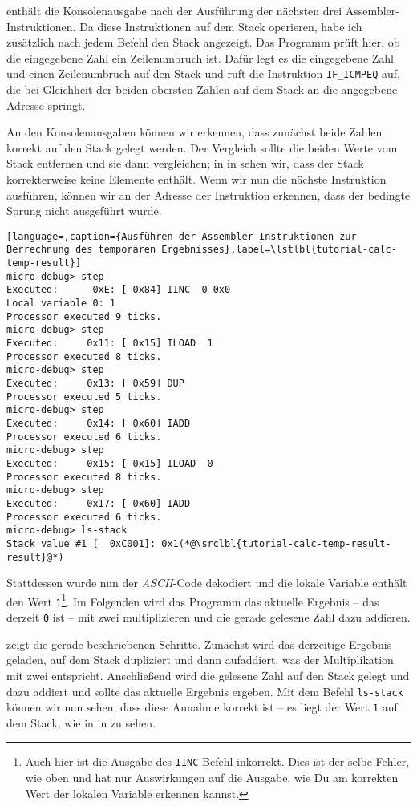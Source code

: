  enthält die Konsolenausgabe nach der Ausführung der nächsten drei Assembler-Instruktionen. Da diese Instruktionen auf dem Stack operieren, habe ich zusätzlich nach jedem Befehl den Stack angezeigt. Das Programm prüft hier, ob die eingegebene Zahl ein Zeilenumbruch ist. Dafür legt es die eingegebene Zahl und einen Zeilenumbruch auf den Stack und ruft die Instruktion \texttt{IF_ICMPEQ} auf, die bei Gleichheit der beiden obersten Zahlen auf dem Stack an die angegebene Adresse springt.

An den Konsolenausgaben können wir erkennen, dass zunächst beide Zahlen korrekt auf den Stack gelegt werden. Der Vergleich sollte die beiden Werte vom Stack entfernen und sie dann vergleichen; in  in  sehen wir, dass der Stack korrekterweise keine Elemente enthält. Wenn wir nun die nächste Instruktion ausführen, können wir an der Adresse der Instruktion erkennen, dass der bedingte Sprung nicht ausgeführt wurde.

\begin{lstlisting}[language=,caption={Ausführen der Assembler-Instruktionen zur Berrechnung des temporären Ergebnisses},label=\lstlbl{tutorial-calc-temp-result}]
micro-debug> step
Executed:      0xE: [ 0x84] IINC  0 0x0
Local variable 0: 1
Processor executed 9 ticks.
micro-debug> step
Executed:     0x11: [ 0x15] ILOAD  1
Processor executed 8 ticks.
micro-debug> step
Executed:     0x13: [ 0x59] DUP 
Processor executed 5 ticks.
micro-debug> step
Executed:     0x14: [ 0x60] IADD 
Processor executed 6 ticks.
micro-debug> step
Executed:     0x15: [ 0x15] ILOAD  0
Processor executed 8 ticks.
micro-debug> step
Executed:     0x17: [ 0x60] IADD 
Processor executed 6 ticks.
micro-debug> ls-stack
Stack value #1 [  0xC001]: 0x1(*@\srclbl{tutorial-calc-temp-result-result}@*)
\end{lstlisting}

Stattdessen wurde nun der \emph{ASCII}-Code dekodiert und die lokale Variable enthält den Wert \texttt{1}\footnote{Auch hier ist die Ausgabe des \texttt{IINC}-Befehl inkorrekt. Dies ist der selbe Fehler, wie oben und hat nur Auswirkungen auf die Ausgabe, wie Du am korrekten Wert der lokalen Variable erkennen kannst.}. Im Folgenden wird das Programm das aktuelle Ergebnis -- das derzeit \texttt{0} ist -- mit zwei multiplizieren und die gerade gelesene Zahl dazu addieren.

 zeigt die gerade beschriebenen Schritte. Zunächst wird das derzeitige Ergebnis geladen, auf dem Stack dupliziert und dann aufaddiert, was der Multiplikation mit zwei entspricht. Anschließend wird die gelesene Zahl auf den Stack gelegt und dazu addiert und sollte das aktuelle Ergebnis ergeben. Mit dem Befehl \texttt{ls-stack} können wir nun sehen, dass diese Annahme korrekt ist -- es liegt der Wert \texttt{1} auf dem Stack, wie in  in  zu sehen.

